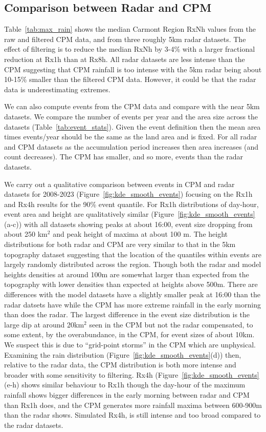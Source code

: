 \documentclass[11pt,a4paper]{article}
\begin{document}
\subsection{Comparison between Radar and  CPM}

Table~\ref{tab:max_rain} shows the median Carmont Region RxNh values from the raw and filtered CPM data, and from three roughly 5km radar datasets.
 The effect of filtering is to reduce the median RxNh by 3-4\% with a larger fractional reduction at Rx1h than at Rx8h.  All  radar datasets are less intense than the CPM suggesting that  CPM rainfall is too intense with the 5km radar being about 10-15\% smaller than the filtered CPM data.  However, it could be that the radar data is underestimating extremes.
 
 We can also compute events from the CPM data and compare with the near 5km datasets. We compare the number of events per year and the area size across the datasets (Table~\ref{tab:event_stats}). Given the event definition then the mean area times events/year should be the same as the land area and is fixed. For all radar and CPM datasets as the accumulation period increases then area increases (and count decreases). The CPM has smaller, and so more, events than the radar datasets. 
 
  We carry out a qualitative comparison between events in  CPM and radar datasets for 2008-2023 (Figure~\ref{fig:kde_smooth_events}) focusing on the Rx1h and Rx4h results for the 90\% event quantile. 
  For Rx1h distributions of day-hour, event area and height are qualitatively similar  (Figure~\ref{fig:kde_smooth_events}(a-c)) with all datasets showing peaks at about 16:00, event size dropping from about 250 km$^2$ and peak height of maxima at about 100 m.
   The height distributions for both radar and CPM are very similar to that in the 5km topography dataset suggesting that the location of the quantiles within events are largely  randomly distributed across the region. 
    Though both the radar and model heights densities  at around 100m are somewhat larger than expected from the topography with lower densities than expected at heights above 500m. 
    There are differences with the model datasets have a slightly smaller peak at 16:00 than the radar datsets have while the CPM has more extreme rainfall in the early morning than does the radar. The largest difference in the event size distribution is the large dip at around 20km$^2$ seen in the CPM but not the radar compensated, to some extent, by the overabundance, in the CPM, for event sizes of about 10km. We suspect this is due to ``grid-point storms'' in the CPM which are unphysical. 
     Examining the rain distribution (Figure~\ref{fig:kde_smooth_events}(d)) then, relative to the radar data, the CPM distribution is both more intense and broader with some sensitivity to filtering.  Rx4h (Figure~\ref{fig:kde_smooth_events}(e-h) shows similar behaviour to Rx1h though the day-hour of the maximum rainfall shows bigger differences in the early morning between radar and CPM than Rx1h does, and the CPM generates more rainfall maxima between 600-900m than the radar shows.  Simulated Rx4h, is still intense and too broad compared to the radar datasets. 
\end{document}
